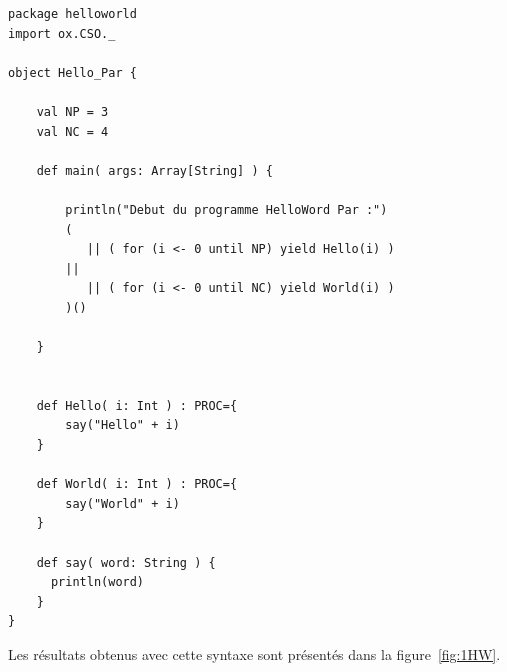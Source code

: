 \documentclass[a4paper,11pt,french]{report}
\begin{document}
\begin{lstlisting}[frame=trBL]
package helloworld
import ox.CSO._

object Hello_Par {

    val NP = 3
    val NC = 4
    
    def main( args: Array[String] ) {
  
        println("Debut du programme HelloWord Par :")
        ( 
           || ( for (i <- 0 until NP) yield Hello(i) )
        || 
           || ( for (i <- 0 until NC) yield World(i) )
        )()
        
    }


    def Hello( i: Int ) : PROC={
    	say("Hello" + i)
    } 

    def World( i: Int ) : PROC={
    	say("World" + i)
    }

    def say( word: String ) {
      println(word)
    }  
}
\end{lstlisting}

Les résultats obtenus avec cette syntaxe sont présentés dans la figure~\vref{fig:1HW}.
\end{document}
